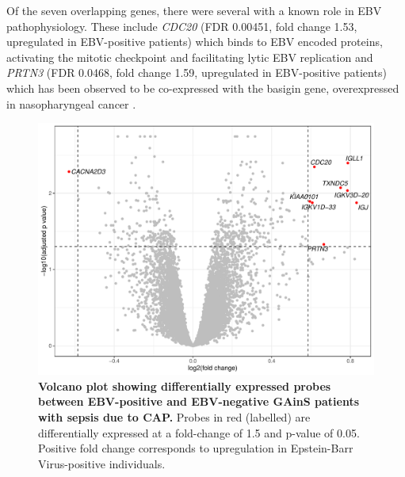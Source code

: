 Of the seven overlapping genes, there were several with a known role in EBV pathophysiology. These include \textit{CDC20} (FDR 0.00451, fold change 1.53, upregulated in EBV-positive patients) which binds to EBV encoded proteins, activating the mitotic checkpoint and facilitating lytic EBV replication \parencite{Li2015} and \textit{PRTN3} (FDR 0.0468, fold change 1.59, upregulated in EBV-positive patients) which has been observed to be co-expressed with the basigin gene, overexpressed in nasopharyngeal cancer \parencite{Gao2017}.

\FloatBarrier
\begin{figure}[htbp]
\centering
\includegraphics[width=\textwidth]{./Results3/Images/ebvsig1.pdf}
\caption[EBV signature]{\textbf{Volcano plot showing differentially expressed probes between EBV-positive and EBV-negative GAinS patients with sepsis due to CAP.} Probes in red (labelled) are differentially expressed at a fold-change of 1.5 and p-value of 0.05. Positive fold change corresponds to upregulation in Epstein-Barr Virus-positive individuals.}
\label{fig:ebvsig1}


\end{figure}

